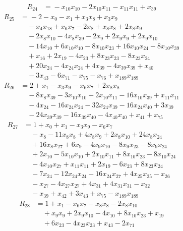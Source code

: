 \begin{align*}
R_{24}&={}-x_{10}x_{10} -2x_{10}x_{11} -x_{11}x_{11} +x_{39}
\end{align*}
\begin{align*}
R_{25}&={}-2 -x_{0} -x_{1} +x_{3}x_{8} +x_{3}x_{9}\\
&\quad{}-x_{4}x_{18} +x_{6}x_{7} -2x_{8} +x_{8}x_{8} +2x_{8}x_{9}\\
&\quad{}-2x_{8}x_{10} -4x_{8}x_{39} -2x_{9} +2x_{9}x_{9} +2x_{9}x_{10}\\
&\quad{}-14x_{10} +6x_{10}x_{10} -8x_{10}x_{23} +16x_{10}x_{24} -8x_{10}x_{39}\\
&\quad{}+x_{16} +2x_{19} -4x_{23} +8x_{23}x_{23} -8x_{23}x_{24}\\
&\quad{}+20x_{24} -4x_{24}x_{24} +4x_{39} -4x_{39}x_{39} +x_{40}\\
&\quad{}-3x_{43} -6x_{71} -x_{75} -x_{76} +x_{189}x_{189}
\end{align*}
\begin{align*}
R_{26}&={}2 +x_{1} -x_{3}x_{9} -x_{6}x_{7} +2x_{8}x_{8}\\
&\quad{}-8x_{8}x_{39} -3x_{10}x_{10} +2x_{10}x_{11} -16x_{10}x_{39} +x_{11}x_{11}\\
&\quad{}-4x_{24} -16x_{24}x_{24} -32x_{24}x_{39} -16x_{24}x_{40} +3x_{39}\\
&\quad{}-24x_{39}x_{39} -16x_{39}x_{40} -4x_{40}x_{40} +x_{41} +x_{75}
\end{align*}
\begin{align*}
R_{27}&={}1 +x_{0} +x_{1} -x_{3}x_{9} -x_{6}x_{7}\\
&\quad{}-x_{8} -11x_{8}x_{8} +4x_{8}x_{9} +2x_{8}x_{10} +24x_{8}x_{24}\\
&\quad{}+16x_{8}x_{27} +6x_{9} -4x_{9}x_{10} -8x_{9}x_{23} -8x_{9}x_{24}\\
&\quad{}+2x_{10} -5x_{10}x_{10} +2x_{10}x_{11} +8x_{10}x_{23} -8x_{10}x_{24}\\
&\quad{}-4x_{10}x_{27} +x_{11}x_{11} +2x_{19} -6x_{23} +8x_{23}x_{24}\\
&\quad{}-7x_{24} -12x_{24}x_{24} -16x_{24}x_{27} +4x_{25}x_{25} -x_{26}\\
&\quad{}-x_{27} -4x_{27}x_{27} +4x_{31} +4x_{31}x_{31} -x_{32}\\
&\quad{}-x_{39} +x_{42} +3x_{43} +x_{75} -x_{189}x_{189}
\end{align*}
\begin{align*}
R_{28}&={}1 +x_{1} -x_{6}x_{7} -x_{8}x_{8} -2x_{8}x_{10}\\
&\quad{}+x_{9}x_{9} +2x_{9}x_{10} -4x_{10} +8x_{10}x_{23} +x_{19}\\
&\quad{}+6x_{23} -4x_{23}x_{23} +x_{43} -2x_{71}
\end{align*}
